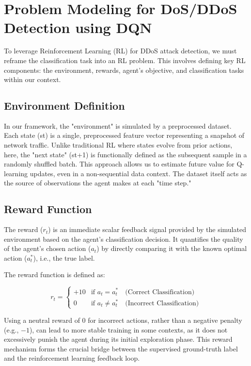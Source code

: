 \documentclass[12pt]{report}
\begin{document}
\section{Problem Modeling for DoS/DDoS Detection using DQN}

To leverage Reinforcement Learning (RL) for DDoS attack detection, we must reframe the classification task into an RL problem. This involves defining key RL components: the environment, rewards, agent's objective, and classification tasks within our context.

\subsection{Environment Definition}
In our framework, the "environment" is simulated by a preprocessed dataset. Each state (st​) is a single, preprocessed feature vector representing a snapshot of network traffic. Unlike traditional RL where states evolve from prior actions, here, the "next state" (st+1​) is functionally defined as the subsequent sample in a randomly shuffled batch. This approach allows us to estimate future value for Q-learning updates, even in a non-sequential data context. The dataset itself acts as the source of observations the agent makes at each "time step."

\subsection{Reward Function}

The reward ($r_t$) is an immediate scalar feedback signal provided by the simulated environment based on the agent's classification decision. It quantifies the quality of the agent’s chosen action ($a_t$) by directly comparing it with the known optimal action ($a_t^*$), i.e., the true label.

The reward function is defined as:

\[
r_t =
\begin{cases}
+10 & \text{if } a_t = a_t^* \quad \text{(Correct Classification)} \\
0   & \text{if } a_t \ne a_t^* \quad \text{(Incorrect Classification)}
\end{cases}
\]

Using a neutral reward of 0 for incorrect actions, rather than a negative penalty (e.g., $-1$), can lead to more stable training in some contexts, as it does not excessively punish the agent during its initial exploration phase. This reward mechanism forms the crucial bridge between the supervised ground-truth label and the reinforcement learning feedback loop.
\end{document}
